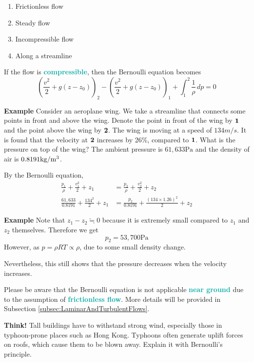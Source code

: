 \documentclass[twoside]{article}
\newcommand{\question}[1]{\begin{questionbox} \emoji{grapes} \textbf{Think!} \newline #1 \end{questionbox}}
\newcommand{\example}[1]{\begin{examplebox} \emoji{croissant} \textbf{Example} \newline #1 \end{examplebox}}
\newcommand{\highlightbluetext}[1]{\textcolor[HTML]{09ACA6}{\textbf{#1}}}
\numberwithin{equation}{section}
\begin{document}
	\begin{enumerate}
		\item Frictionless flow
		\item Steady flow
		\item Incompressible flow
		\item Along a streamline
	\end{enumerate}
	If the flow is \highlightbluetext{compressible}, then the Bernoulli equation becomes
	\begin{equation}
		\left( \frac{v^2}{2}+g(z-z_0) \right)_2-\left( \frac{v^2}{2}+g(z-z_0) \right)_1+\int_1^2 \frac{1}{\rho} \, dp = 0
		\label{eq:BernoulliEquationCompressible}
	\end{equation}
	
	\example{
		Consider an aeroplane wing. We take a streamline that connects some points in front and above the wing. Denote the point in front of the wing by $\bf{1}$ and the point above the wing by $\bf{2}$. The wing is moving at a speed of $134 \unit{m/s}$. It is found that the velocity at $\bf{2}$ increases by 26\%, compared to $\bf{1}$. What is the pressure on top of the wing? The ambient pressure is $61,633 \unit{\pascal}$ and the density of air is $0.8191 \unit{kg/m\cubed}$.
		
		By the Bernoulli equation,
		\begin{align*}
			\frac{p_1}{\rho}+\frac{v_1^2}{2}+z_1 &= \frac{p_2}{\rho}+\frac{v_2^2}{2}+z_2 \\
			\frac{61,633}{0.8191}+\frac{134^2}{2}+z_1 &= \frac{p_2}{0.8191}+\frac{(134 \times 1.26)^2}{2}+z_2
		\end{align*}
	}
	
	\example{
		Note that $z_1-z_2 \fallingdotseq 0$ because it is extremely small compared to $z_1$ and $z_2$ themselves. Therefore we get
		\begin{equation*}
			p_2 = 53,700 \unit{\pascal}
		\end{equation*}
		However, as $p = \rho RT \propto \rho$, due to some small density change.
		
		Nevertheless, this still shows that the pressure decreases when the velocity increases.
	}
	
	Please be aware that the Bernoulli equation is not applicable \highlightbluetext{near ground} due to the assumption of \highlightbluetext{frictionless flow}. More details will be provided in Subsection \ref{subsec:LaminarAndTurbulentFlows}.
	
	\question{
		Tall buildings have to withstand strong wind, especially those in typhoon-prone places such as Hong Kong. Typhoons often generate uplift forces on roofs, which cause them to be blown away. Explain it with Bernoulli's principle.
	}
	
\end{document}
